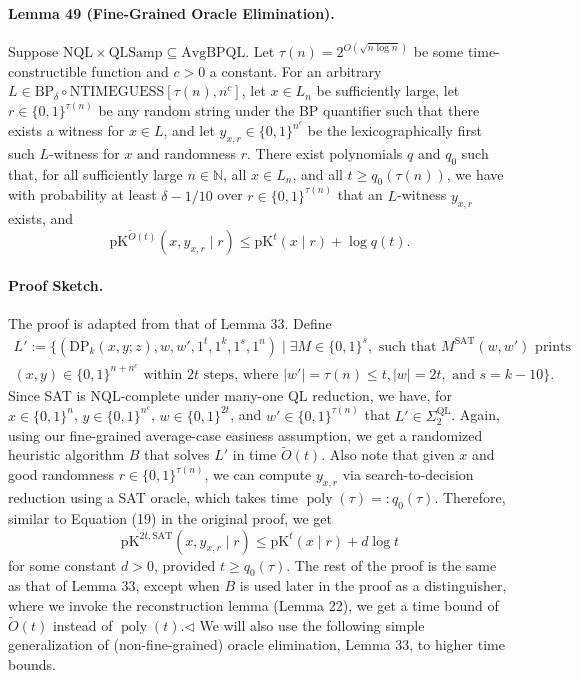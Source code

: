 \documentclass[10pt,a4paper]{article}
\begin{document}
\paragraph{Lemma 49 (Fine-Grained Oracle Elimination).} Suppose $\mathrm{NQL}\times\mathrm{QLSamp}\subseteq\mathrm{AvgBPQL}$. Let $\tau(n)=2^{O(\sqrt{n\log n})}$ be some time-constructible function and $c>0$ a constant. For an arbitrary $L\in\mathrm{BP}_\delta\circ\mathrm{NTIMEGUESS}[\tau(n),n^c]$, let $x\in L_n$ be sufficiently large, let $r\in\{0,1\}^{\tau(n)}$ be any random string under the BP quantifier such that there exists a witness for $x\in L$, and let $y_{x,r}\in\{0,1\}^{n^c}$ be the lexicographically first such $L$-witness for $x$ and randomness $r$.
There exist polynomials $q$ and $q_0$ such that, for all sufficiently large $n\in\mathbb N$, all $x\in L_n$, and all $t\geq q_0(\tau(n))$, we have with probability at least $\delta-1/10$ over $r\in\{0,1\}^{\tau(n)}$ that an $L$-witness $y_{x,r}$ exists, and
\[\mathrm{pK}^{\widetilde O(t)}(x,y_{x,r}\mid r)\leq\mathrm{pK}^t(x\mid r)+\log q(t).\]
\paragraph{Proof Sketch.} The proof is adapted from that of Lemma 33. Define
\begin{multline*}
L':=\{(\mathrm{DP}_k(x,y;z),w,w',1^t,1^k,1^s,1^n)\mid\exists M\in\{0,1\}^s,\text{ such that }M^{\mathrm{SAT}}(w,w')\text{ prints}\\
(x,y)\in\{0,1\}^{n+n^c}\text{ within }2t\text{ steps, where }|w'|=\tau(n)\leq t,|w|=2t,\text{ and }s=k-10\}.
\end{multline*}
Since SAT is NQL-complete under many-one QL reduction, we have, for $x\in\{0,1\}^n$, $y\in\{0,1\}^{n^c}$, $w\in\{0,1\}^{2t}$, and $w'\in\{0,1\}^{\tau(n)}$ that $L'\in\Sigma_2^{\mathrm{QL}}$.
Again, using our fine-grained average-case easiness assumption, we get a randomized heuristic algorithm $B$ that solves $L'$ in time $\widetilde O(t)$. Also note that given $x$ and good randomness $r\in\{0,1\}^{\tau(n)}$, we can compute $y_{x,r}$ via search-to-decision reduction using a SAT oracle, which takes time $\operatorname{poly}(\tau)=:q_0(\tau)$. Therefore, similar to Equation (19) in the original proof, we get
\[\mathrm{pK}^{2t,\mathrm{SAT}}(x,y_{x,r}\mid r)\leq\mathrm{pK}^t(x\mid r)+d\log t\tag{30}\]
for some constant $d>0$, provided $t\geq q_0(\tau)$. The rest of the proof is the same as that of Lemma 33, except when $B$ is used later in the proof as a distinguisher, where we invoke the reconstruction lemma (Lemma 22), we get a time bound of $\widetilde O(t)$ instead of $\operatorname{poly}(t)$.\hfill$\triangleleft$
We will also use the following simple generalization of (non-fine-grained) oracle elimination, Lemma 33, to higher time bounds.
\end{document}
